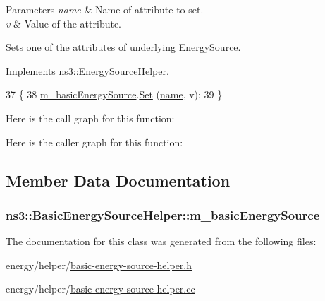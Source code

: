 \begin{DoxyParams}{Parameters}
{\em name} & Name of attribute to set. \\
\hline
{\em v} & Value of the attribute.\\
\hline
\end{DoxyParams}
Sets one of the attributes of underlying \hyperlink{classns3_1_1EnergySource}{Energy\+Source}. 

Implements \hyperlink{classns3_1_1EnergySourceHelper_ace926f92f679fac7fe7188c9c144ef4a}{ns3\+::\+Energy\+Source\+Helper}.


\begin{DoxyCode}
37 \{
38   \hyperlink{classns3_1_1BasicEnergySourceHelper_aee6248ff579a48fdd530f28a41596bea}{m\_basicEnergySource}.\hyperlink{classns3_1_1ObjectFactory_aef5c0d5019c96bdf01cefd1ff83f4a68}{Set} (\hyperlink{generate__test__data__lte__spectrum__model_8m_ab74e6bf80237ddc4109968cedc58c151}{name}, v);
39 \}
\end{DoxyCode}


Here is the call graph for this function\+:




Here is the caller graph for this function\+:




\subsection{Member Data Documentation}
\subsubsection[{\texorpdfstring{m\+\_\+basic\+Energy\+Source}{m_basicEnergySource}}]{ ns3\+::\+Basic\+Energy\+Source\+Helper\+::m\+\_\+basic\+Energy\+Source\hspace{0.3cm}{\ttfamily [private]}}\hypertarget{classns3_1_1BasicEnergySourceHelper_aee6248ff579a48fdd530f28a41596bea}{}\label{classns3_1_1BasicEnergySourceHelper_aee6248ff579a48fdd530f28a41596bea}


The documentation for this class was generated from the following files\+:\begin{DoxyCompactItemize}
\item 
energy/helper/\hyperlink{basic-energy-source-helper_8h}{basic-\/energy-\/source-\/helper.\+h}\item 
energy/helper/\hyperlink{basic-energy-source-helper_8cc}{basic-\/energy-\/source-\/helper.\+cc}\end{DoxyCompactItemize}
